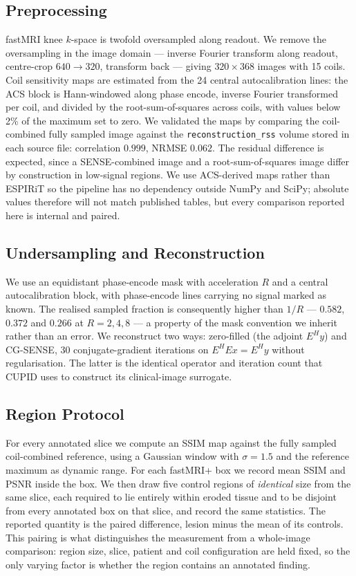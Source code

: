 \documentclass[letterpaper]{article} %
\begin{document}
\subsection{Preprocessing}
fastMRI knee $k$-space is twofold oversampled along readout. We remove the
oversampling in the image domain --- inverse Fourier transform along readout,
centre-crop $640 \rightarrow 320$, transform back --- giving $320\times368$
images with 15 coils. Coil sensitivity maps are estimated from the 24 central
autocalibration lines: the ACS block is Hann-windowed along phase encode,
inverse Fourier transformed per coil, and divided by the root-sum-of-squares
across coils, with values below 2\% of the maximum set to zero. We validated the
maps by comparing the coil-combined fully sampled image against the
\texttt{reconstruction\_rss} volume stored in each source file: correlation
$0.999$, NRMSE $0.062$. The residual difference is expected, since a
SENSE-combined image and a root-sum-of-squares image differ by construction in
low-signal regions. We use ACS-derived maps rather than ESPIRiT so the pipeline
has no dependency outside NumPy and SciPy; absolute values therefore will not
match published tables, but every comparison reported here is internal and
paired.

\subsection{Undersampling and Reconstruction}
We use an equidistant phase-encode mask with acceleration $R$ and a central
autocalibration block, with phase-encode lines carrying no signal marked as
known. The realised sampled fraction is consequently higher than $1/R$ ---
$0.582$, $0.372$ and $0.266$ at $R{=}2,4,8$ --- a property of the mask
convention we inherit rather than an error. We reconstruct two ways: zero-filled
(the adjoint $E^{H}y$) and CG-SENSE, 30 conjugate-gradient iterations on
$E^{H}E x = E^{H} y$ without regularisation. The latter is the identical
operator and iteration count that CUPID uses to construct its clinical-image
surrogate.

\subsection{Region Protocol}
For every annotated slice we compute an SSIM map against the fully sampled
coil-combined reference, using a Gaussian window with $\sigma{=}1.5$ and the
reference maximum as dynamic range. For each fastMRI+ box we record mean SSIM
and PSNR inside the box. We then draw five control regions of \emph{identical}
size from the same slice, each required to lie entirely within eroded tissue and
to be disjoint from every annotated box on that slice, and record the same
statistics. The reported quantity is the paired difference, lesion minus the
mean of its controls. This pairing is what distinguishes the measurement from a
whole-image comparison: region size, slice, patient and coil configuration are
held fixed, so the only varying factor is whether the region contains an
annotated finding.
\end{document}
